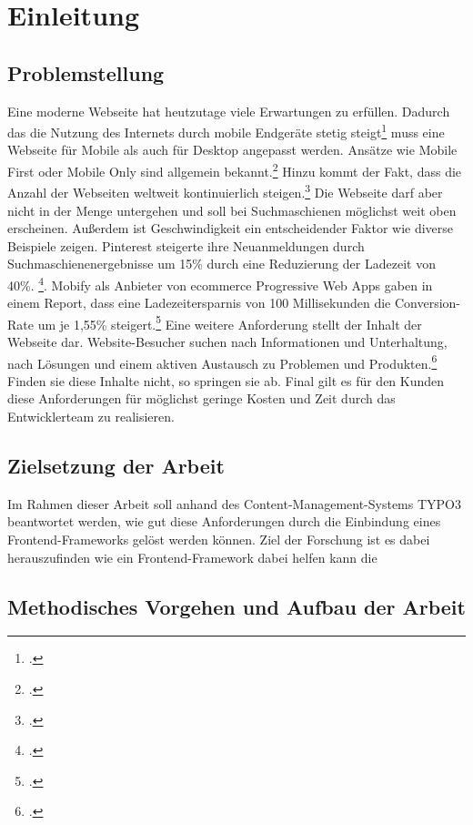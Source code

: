 \section{Einleitung}
\subsection{Problemstellung}
Eine moderne Webseite hat heutzutage viele Erwartungen zu erfüllen. Dadurch das die Nutzung des Internets durch mobile Endgeräte stetig steigt\footcite[5]{Cisco.GlobalTraffic} muss eine Webseite für Mobile als auch für Desktop angepasst werden.
Ansätze wie Mobile First oder Mobile Only sind allgemein bekannt.\footcite[Vgl]{Krug.2018}
Hinzu kommt der Fakt, dass die Anzahl der Webseiten weltweit kontinuierlich steigen.\footcite{InternetLiveStats}
Die Webseite darf aber nicht in der Menge untergehen und soll bei Suchmaschienen möglichst weit oben erscheinen. 
Außerdem ist Geschwindigkeit ein entscheidender Faktor wie diverse Beispiele zeigen. Pinterest steigerte ihre Neuanmeldungen durch Suchmaschienenergebnisse um 15\% durch eine Reduzierung der Ladezeit von 40\%. \footcite{Pinterest.Increased}.
Mobify als Anbieter von ecommerce Progressive Web Apps gaben in einem Report, dass eine Ladezeitersparnis von 100 Millisekunden die Conversion-Rate um je 1,55\% steigert.\footcite[3]{Mobify.2016}
Eine weitere Anforderung stellt der Inhalt der Webseite dar. Website-Besucher suchen nach Informationen und Unterhaltung, nach Lösungen und einem aktiven Austausch zu Problemen und Produkten.\footcite[Vgl.][25]{Loeffler.2014}
Finden sie diese Inhalte nicht, so springen sie ab.
Final gilt es für den Kunden diese Anforderungen für möglichst geringe Kosten und Zeit durch das Entwicklerteam zu realisieren.
\subsection{Zielsetzung der Arbeit}
Im Rahmen dieser Arbeit soll anhand des Content-Management-Systems TYPO3 beantwortet werden, wie gut diese Anforderungen durch die Einbindung eines Frontend-Frameworks gelöst werden können.
Ziel der Forschung ist es dabei herauszufinden wie ein Frontend-Framework dabei helfen kann die 
\subsection{Methodisches Vorgehen und Aufbau der Arbeit}